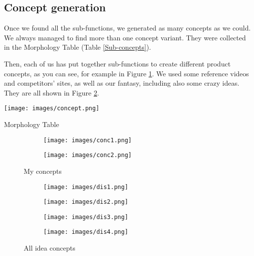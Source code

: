\documentclass[11pt,a4paper]{article}
\begin{document}
	
	\subsection{Concept generation}
		Once we found all the sub-functions, we generated as many concepts as we could. We always managed to find more than one concept variant. They were collected in the Morphology Table (Table \ref{Sub-concepts}).
		
		\smallskip
		
		Then, each of us has put together sub-functions to create different product concepts, as you can see, for example in Figure \ref{My concepts}. We used some reference videos and competitors' sites, as well as our fantasy, including also some crazy ideas. They are all shown in Figure \ref{All idea concepts}.
		\begin{table}[H]
			\centering
			\texttt{[image: images/concept.png]}
			\caption{Morphology Table}
			\label{Sub-concepts}
		\end{table}
		
		
		\begin{figure}[H]
			\begin{subfigure}[b]{0.5\textwidth}
				\centering
				\texttt{[image: images/conc1.png]}
			\end{subfigure}
			\hfill
			\begin{subfigure}[b]{0.5\textwidth}
				\centering
				\texttt{[image: images/conc2.png]}
			\end{subfigure}
			\caption{My concepts}
			\label{My concepts}
		\end{figure}
	
		\begin{figure}[H]
			\begin{subfigure}[b]{0.5\textwidth}
				\centering
				\texttt{[image: images/dis1.png]}
			\end{subfigure}
			\hfill
			\begin{subfigure}[b]{0.5\textwidth}
				\centering
				\texttt{[image: images/dis2.png]}
			\end{subfigure}
		\end{figure}
	
		\begin{figure}[H]
			\begin{subfigure}[b]{0.5\textwidth}
				\centering
				\texttt{[image: images/dis3.png]}
			\end{subfigure}
			\hfill
			\begin{subfigure}[b]{0.5\textwidth}
				\centering
				\texttt{[image: images/dis4.png]}
			\end{subfigure}
			\caption{All idea concepts}
			\label{All idea concepts}
		\end{figure}
	
\end{document}
